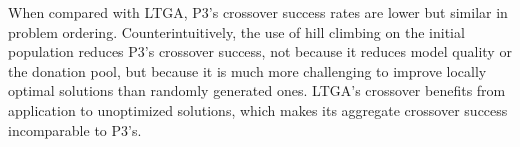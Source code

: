 \documentclass[twoside]{article}
\begin{document}
\begin{comment}
Solutions are only added to the next highest pyramid level if at least one crossover donation resulted in a fitness
improvement. Figure~\ref{fig-cross-success} examines the percentage of crossover donations that resulted in a fitness
improvement. The ordering in Figure~\ref{fig-cross-success} is an almost perfect inversion of Figure~\ref{fig-cross},
implying that the more successful crossover is at achieving fitness improving donations the lower the proportion of evaluations P3 will
spend performing crossover. P3 achieves an impressive 30\% success rate for crossover donations on the largest Deceptive Trap
problem sizes. This makes sense as crossover is able to immediately and perfectly identify entire traps such that all donations
always contain only complete traps. Furthermore, by forcing crossover to attempt donations of genes different from the current solution,
donations containing a single trap will have a very high success rate, always improving suboptimal traps which are far more frequently
created by local search that optimal traps. Rastrigin and HIFF have relatively high success rates of 11\% and 7\%, respectively. Again
this is likely due to accurate modeling and relatively low diversity of building block alternatives.
Ising Spin Glasses and Deceptive Step Trap both have low success rates near 0.01\%. This follows as both are difficult to model with
a linkage tree. In comparison to Figure~\ref{fig-cross-success} Deceptive Step Trap performs better than expected for crossover.
However, the reason for this is that even exceedingly uninformed crossover can make improvements to Deceptive Step Trap as
flipping two bits in the same trap will move between two local optima. Nearest Neighbor NK had the least successful crossovers,
with only 0.007\% successful on the largest tested problems. In comparison to Ising Spin Glass, NK's overlap is far more extensive.
As a result it makes sense that individual crossovers are very unlikely to be fitness improvements.
\end{comment}

When compared with LTGA, P3's crossover success rates are lower but similar in problem ordering.
Counterintuitively, the use of hill climbing on the initial population reduces
P3's crossover success, not because it reduces model quality or the donation pool, but because it is much more challenging to improve
locally optimal solutions than randomly generated ones. LTGA's crossover benefits from application to unoptimized solutions, which
makes its aggregate crossover success incomparable to P3's.
\end{document}
